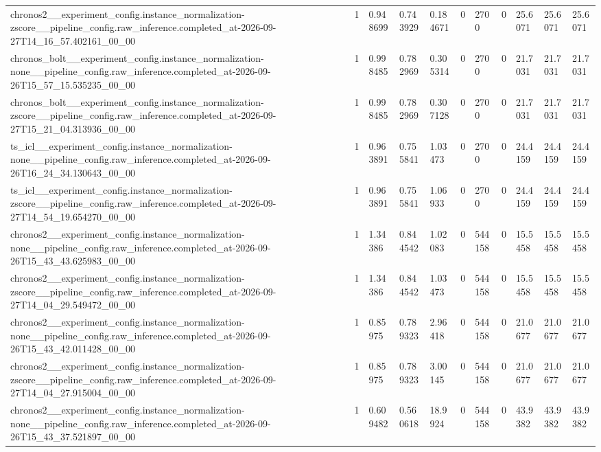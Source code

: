 \begin{tabular}{lllllllllll}
chronos2\_\_experiment\_config.instance\_normalization-zscore\_\_pipeline\_config.raw\_inference.completed\_at-2026-09-27T14\_16\_57.402161\_00\_00 & 1 & 0.948699 & 0.743929 & 0.184671 & 0 & 2700 & 0 & 25.6071 & 25.6071 & 25.6071 \\
chronos\_bolt\_\_experiment\_config.instance\_normalization-none\_\_pipeline\_config.raw\_inference.completed\_at-2026-09-26T15\_57\_15.535235\_00\_00 & 1 & 0.998485 & 0.782969 & 0.305314 & 0 & 2700 & 0 & 21.7031 & 21.7031 & 21.7031 \\
chronos\_bolt\_\_experiment\_config.instance\_normalization-zscore\_\_pipeline\_config.raw\_inference.completed\_at-2026-09-27T15\_21\_04.313936\_00\_00 & 1 & 0.998485 & 0.782969 & 0.307128 & 0 & 2700 & 0 & 21.7031 & 21.7031 & 21.7031 \\
ts\_icl\_\_experiment\_config.instance\_normalization-none\_\_pipeline\_config.raw\_inference.completed\_at-2026-09-26T16\_24\_34.130643\_00\_00 & 1 & 0.963891 & 0.755841 & 1.03473 & 0 & 2700 & 0 & 24.4159 & 24.4159 & 24.4159 \\
ts\_icl\_\_experiment\_config.instance\_normalization-zscore\_\_pipeline\_config.raw\_inference.completed\_at-2026-09-27T14\_54\_19.654270\_00\_00 & 1 & 0.963891 & 0.755841 & 1.06933 & 0 & 2700 & 0 & 24.4159 & 24.4159 & 24.4159 \\
chronos2\_\_experiment\_config.instance\_normalization-none\_\_pipeline\_config.raw\_inference.completed\_at-2026-09-26T15\_43\_43.625983\_00\_00 & 1 & 1.34386 & 0.844542 & 1.02083 & 0 & 544158 & 0 & 15.5458 & 15.5458 & 15.5458 \\
chronos2\_\_experiment\_config.instance\_normalization-zscore\_\_pipeline\_config.raw\_inference.completed\_at-2026-09-27T14\_04\_29.549472\_00\_00 & 1 & 1.34386 & 0.844542 & 1.03473 & 0 & 544158 & 0 & 15.5458 & 15.5458 & 15.5458 \\
chronos2\_\_experiment\_config.instance\_normalization-none\_\_pipeline\_config.raw\_inference.completed\_at-2026-09-26T15\_43\_42.011428\_00\_00 & 1 & 0.85975 & 0.789323 & 2.96418 & 0 & 544158 & 0 & 21.0677 & 21.0677 & 21.0677 \\
chronos2\_\_experiment\_config.instance\_normalization-zscore\_\_pipeline\_config.raw\_inference.completed\_at-2026-09-27T14\_04\_27.915004\_00\_00 & 1 & 0.85975 & 0.789323 & 3.00145 & 0 & 544158 & 0 & 21.0677 & 21.0677 & 21.0677 \\
chronos2\_\_experiment\_config.instance\_normalization-none\_\_pipeline\_config.raw\_inference.completed\_at-2026-09-26T15\_43\_37.521897\_00\_00 & 1 & 0.609482 & 0.560618 & 18.9924 & 0 & 544158 & 0 & 43.9382 & 43.9382 & 43.9382 \\

\end{tabular}
